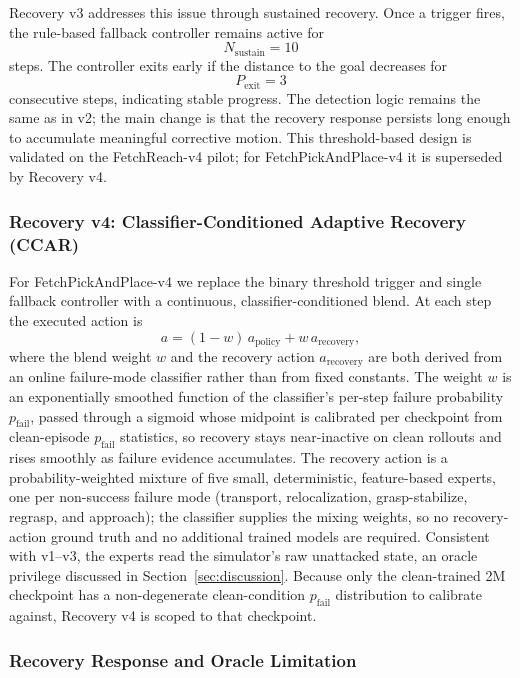 \documentclass[conference]{IEEEtran}
\begin{document}
Recovery v3 addresses this issue through sustained recovery. Once a trigger fires, the
rule-based fallback controller remains active for
\[
N_{\mathrm{sustain}} = 10
\]
steps. The controller exits early if the distance to the goal decreases for
\[
P_{\mathrm{exit}} = 3
\]
consecutive steps, indicating stable progress. The detection logic remains the same as
in v2; the main change is that the recovery response persists long enough to accumulate
meaningful corrective motion. This threshold-based design is validated on the
FetchReach-v4 pilot; for FetchPickAndPlace-v4 it is superseded by Recovery v4.

\subsubsection{Recovery v4: Classifier-Conditioned Adaptive Recovery (CCAR)}

For FetchPickAndPlace-v4 we replace the binary threshold trigger and single fallback
controller with a continuous, classifier-conditioned blend. At each step the executed
action is
\[
a = (1-w)\,a_{\mathrm{policy}} + w\,a_{\mathrm{recovery}},
\]
where the blend weight $w$ and the recovery action $a_{\mathrm{recovery}}$ are both
derived from an online failure-mode classifier rather than from fixed constants. The
weight $w$ is an exponentially smoothed function of the classifier's per-step failure
probability $p_{\mathrm{fail}}$, passed through a sigmoid whose midpoint is calibrated
per checkpoint from clean-episode $p_{\mathrm{fail}}$ statistics, so recovery stays
near-inactive on clean rollouts and rises smoothly as failure evidence accumulates. The
recovery action is a probability-weighted mixture of five small, deterministic,
feature-based experts, one per non-success failure mode (transport, relocalization,
grasp-stabilize, regrasp, and approach); the classifier supplies the mixing weights, so
no recovery-action ground truth and no additional trained models are required.
Consistent with v1--v3, the experts read the simulator's raw unattacked state, an oracle
privilege discussed in Section~\ref{sec:discussion}. Because only the clean-trained 2M
checkpoint has a non-degenerate clean-condition $p_{\mathrm{fail}}$ distribution to
calibrate against, Recovery v4 is scoped to that checkpoint.

\subsubsection{Recovery Response and Oracle Limitation}
\end{document}
